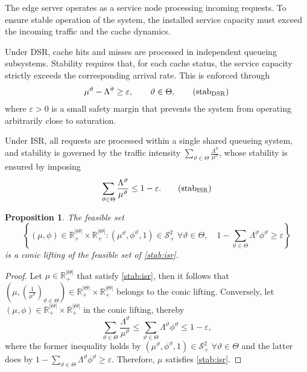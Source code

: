 \documentclass[a4paper,11pt,reqno]{amsart}
\newtheorem{proposition}{Proposition}
\newcommand{\R}{\mathbb{R}}
\renewcommand{\SS}{\mathcal{S}}
\begin{document}
 The edge server operates as a service node processing incoming requests. To ensure stable operation of the system, the installed service capacity must exceed the incoming traffic and the cache dynamics.

Under DSR, cache hits and misses are processed in independent queueing subsystems. Stability requires that, for each cache status, the service capacity strictly exceeds the corresponding arrival rate. This is enforced through
\begin{align}
    \mu^\vartheta - \Lambda^\vartheta \ge \varepsilon,
    \qquad
    \vartheta \in \Theta,\label{stab:dsr}\tag{stab$_{\rm DSR}$}
\end{align}
where $\varepsilon > 0$ is a small safety margin that prevents the system from operating arbitrarily close to saturation.

Under ISR, all requests are processed within a single shared queueing system, and stability is governed by the traffic intensity $\sum_{\vartheta\in\Theta}\frac{\Lambda^\vartheta}{\mu^\vartheta}$, whose stability is ensured by imposing
\begin{align} \sum_{\vartheta\in \Theta} \frac{\Lambda^\vartheta}{\mu^\vartheta} \le 1 - \varepsilon. \label{stab:isr}\tag{stab$_{\rm ISR}$}
\end{align}


\begin{proposition}\label{prop:stab}
    The feasible set 
    \begin{equation*}
    \left\{(\mu,\phi)\in \R^{|\Theta|}_+\times\R^{|\Theta|}_+ :  (\mu^\vartheta, \phi^\vartheta,1)\in \SS^2_+\;  \forall \vartheta\in\Theta, \quad 1-\sum_{\vartheta\in\Theta} \Lambda^\vartheta\phi^\vartheta \geq \varepsilon\right\}
    \end{equation*}
    is a conic lifting of the feasible set of \eqref{stab:isr}.
\end{proposition}

\begin{proof}
    Let $\mu\in \R^{|\Theta|}_+$ that satisfy \eqref{stab:isr}, then it follows that $\left(\mu, \left(\frac{1}{\mu^\vartheta}\right)_{\vartheta\in\Theta}\right)\in \R^{|\Theta|}_+\times\R^{|\Theta|}_+$ belongs to the conic lifting. Conversely, let $(\mu,\phi)\in \R^{|\Theta|}_+\times\R^{|\Theta|}_+$ in the conic lifting, thereby
    \begin{equation*}
        \sum_{\vartheta\in \Theta} \frac{\Lambda^\vartheta}{\mu^\vartheta} \leq \sum_{\vartheta\in\Theta} \Lambda^\vartheta\phi^\vartheta \leq 1-\varepsilon,
    \end{equation*}
    where the former inequality holds by $(\mu^\vartheta, \phi^\vartheta,1)\in \SS^2_+\;  \forall \vartheta\in\Theta$ and the latter does by $1-\sum_{\vartheta\in\Theta} \Lambda^\vartheta\phi^\vartheta \geq \varepsilon$. Therefore, $\mu$ satisfies \eqref{stab:isr}.
\end{proof}
\end{document}
